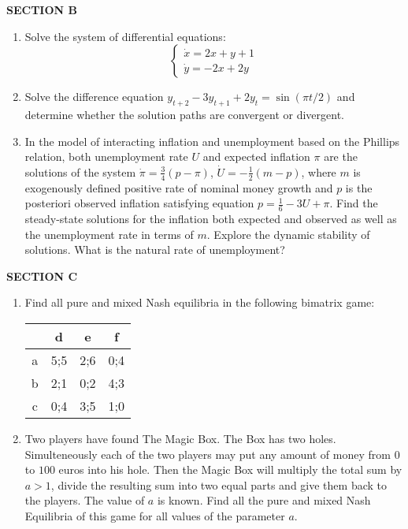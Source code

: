 \vspace{20pt}
\textbf{SECTION B}
\vspace{20pt}

\begin{enumerate}[resume]
\item Solve the system of differential equations:
\[
\begin{cases}
\dot{x}=2x+y+1 \\
\dot{y}=-2x+2y
\end{cases}
\]
\item Solve the difference equation $y_{t+2}-3y_{t+1}+2y_t=\sin(\pi t/2)$ and determine whether the solution paths are convergent or divergent.

\item In the model of interacting inflation and unemployment based on the Phillips relation,  both unemployment rate $U$ and expected inflation $\pi$ are the solutions of the system $\dot{\pi}=\frac{3}{4}(p-\pi)$, $\dot{U}=-\frac{1}{2}(m-p)$, where $m$ is exogenously defined positive rate of nominal money growth and $p$ is the posteriori observed inflation satisfying equation $p=\frac{1}{6}-3U+\pi$. Find the steady-state solutions for the inflation both expected and observed as well as the unemployment rate in terms of $m$. Explore the dynamic stability of solutions. What is the natural rate of unemployment?
\end{enumerate}

\vspace{20pt}
\textbf{SECTION C}
\vspace{20pt}

\begin{enumerate}[resume]
\item Find all pure and mixed Nash equilibria in the following bimatrix game:


\begin{tabular}{c|ccc}
 & d & e & f \\
\hline
a & 5;5 & 2;6 & 0;4  \\
b & 2;1 & 0;2 & 4;3  \\
c & 0;4 & 3;5 & 1;0  \\
\end{tabular}


\item Two players have found The Magic Box. The Box has two holes. Simulteneously each of the two players may put any amount of money from $0$ to $100$ euros into his hole. Then the Magic Box will multiply the total sum by $a>1$, divide the resulting sum into two equal parts and give them back to the players. The value of $a$ is known. Find all the pure and mixed Nash Equilibria of this game for all values of the parameter $a$.

\end{enumerate}
